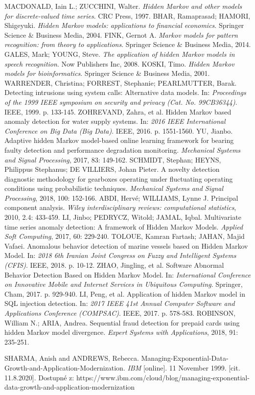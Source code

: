 \documentclass[11pt,twoside,openright]{report}
\begin{document}
\begin{thebibliography}{L}
MACDONALD, Iain L.; ZUCCHINI, Walter. \textit{Hidden Markov and other models for discrete-valued time series}. CRC Press, 1997.
BHAR, Ramaprasad; HAMORI, Shigeyuki. \textit{Hidden Markov models: applications to financial economics}. Springer Science \& Business Media, 2004.
FINK, Gernot A. \textit{Markov models for pattern recognition: from theory to applications}. Springer Science \& Business Media, 2014.
GALES, Mark; YOUNG, Steve. \textit{The application of hidden Markov models in speech recognition}. Now Publishers Inc, 2008.
KOSKI, Timo. \textit{Hidden Markov models for bioinformatics}. Springer Science \& Business Media, 2001.
WARRENDER, Christina; FORREST, Stephanie; PEARLMUTTER, Barak. Detecting intrusions using system calls: Alternative data models. In: \textit{Proceedings of the 1999 IEEE symposium on security and privacy (Cat. No. 99CB36344)}. IEEE, 1999. p. 133-145.
ZOHREVAND, Zahra, et al. Hidden Markov based anomaly detection for water supply systems. In: \textit{2016 IEEE International Conference on Big Data (Big Data)}. IEEE, 2016. p. 1551-1560.
YU, Jianbo. Adaptive hidden Markov model-based online learning framework for bearing faulty detection and performance degradation monitoring. \textit{Mechanical Systems and Signal Processing}, 2017, 83: 149-162.
SCHMIDT, Stephan; HEYNS, Philippus Stephanus; DE VILLIERS, Johan Pieter. A novelty detection diagnostic methodology for gearboxes operating under fluctuating operating conditions using probabilistic techniques. \textit{Mechanical Systems and Signal Processing}, 2018, 100: 152-166.
ABDI, Hervé; WILLIAMS, Lynne J. Principal component analysis. \textit{Wiley interdisciplinary reviews: computational statistics}, 2010, 2.4: 433-459.
LI, Jinbo; PEDRYCZ, Witold; JAMAL, Iqbal. Multivariate time series anomaly detection: A framework of Hidden Markov Models. \textit{Applied Soft Computing}, 2017, 60: 229-240.
TOLOUE, Kamran Fartash; JAHAN, Majid Vafaei. Anomalous behavior detection of marine vessels based on Hidden Markov Model. In: \textit{2018 6th Iranian Joint Congress on Fuzzy and Intelligent Systems (CFIS)}. IEEE, 2018. p. 10-12.
ZHAO, Jingling, et al. Software Abnormal Behavior Detection Based on Hidden Markov Model. In: \textit{International Conference on Innovative Mobile and Internet Services in Ubiquitous Computing}. Springer, Cham, 2017. p. 929-940.
LI, Peng, et al. Application of hidden Markov model in SQL injection detection. In: \textit{2017 IEEE 41st Annual Computer Software and Applications Conference (COMPSAC)}. IEEE, 2017. p. 578-583.
ROBINSON, William N.; ARIA, Andrea. Sequential fraud detection for prepaid cards using hidden Markov model divergence. \textit{Expert Systems with Applications}, 2018, 91: 235-251.

SHARMA, Anish and ANDREWS, Rebecca. Managing-Exponential-Data-Growth-and-Application-Modernization. \textit{IBM} [online]. 11 November 1999. [cit. 11.8.2020]. Dostupné z: https://www.ibm.com/cloud/blog/managing-exponential-data-growth-and-application-modernization 
\end{thebibliography}
\end{document}
